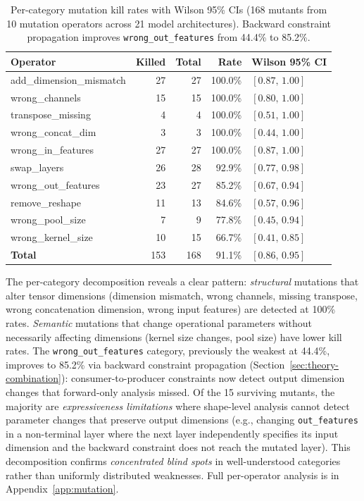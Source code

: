 \documentclass[11pt]{article}
\begin{document}
\begin{table}[h]
\centering
\caption{Per-category mutation kill rates with Wilson 95\% CIs
  (168 mutants from 10 mutation operators across 21 model architectures).
  Backward constraint propagation improves \texttt{wrong\_out\_features}
  from 44.4\% to 85.2\%.}
\label{tab:mutation-category}
\small
\begin{tabular}{@{}lrrrl@{}}
\toprule
\textbf{Operator} & \textbf{Killed} & \textbf{Total} & \textbf{Rate} &
  \textbf{Wilson 95\% CI} \\
\midrule
add\_dimension\_mismatch   & 27 & 27 & 100.0\% & $[0.87,\, 1.00]$ \\
wrong\_channels            & 15 & 15 & 100.0\% & $[0.80,\, 1.00]$ \\
transpose\_missing         &  4 &  4 & 100.0\% & $[0.51,\, 1.00]$ \\
wrong\_concat\_dim         &  3 &  3 & 100.0\% & $[0.44,\, 1.00]$ \\
wrong\_in\_features        & 27 & 27 & 100.0\% & $[0.87,\, 1.00]$ \\
swap\_layers               & 26 & 28 &  92.9\% & $[0.77,\, 0.98]$ \\
wrong\_out\_features       & 23 & 27 &  85.2\% & $[0.67,\, 0.94]$ \\
remove\_reshape            & 11 & 13 &  84.6\% & $[0.57,\, 0.96]$ \\
wrong\_pool\_size          &  7 &  9 &  77.8\% & $[0.45,\, 0.94]$ \\
wrong\_kernel\_size        & 10 & 15 &  66.7\% & $[0.41,\, 0.85]$ \\
\midrule
\textbf{Total}             & 153 & 168 & 91.1\% & $[0.86,\, 0.95]$ \\
\bottomrule
\end{tabular}
\end{table}

The per-category decomposition reveals a clear pattern:
\emph{structural} mutations that alter tensor dimensions
(dimension mismatch, wrong channels, missing transpose, wrong concatenation
dimension, wrong input features)
are detected at 100\% rates.  \emph{Semantic} mutations
that change operational parameters without necessarily affecting
dimensions (kernel size changes, pool size) have lower kill rates.
The \texttt{wrong\_out\_features} category, previously the weakest
at 44.4\%, improves to 85.2\% via backward constraint propagation
(Section~\ref{sec:theory-combination}): consumer-to-producer constraints
now detect output dimension changes that forward-only analysis missed.
Of the 15 surviving mutants, the majority are
\emph{expressiveness limitations} where shape-level analysis cannot detect
parameter changes that preserve output dimensions (e.g., changing
\texttt{out\_features} in a non-terminal layer where the next layer
independently specifies its input dimension and the backward constraint
does not reach the mutated layer).
This decomposition
confirms \emph{concentrated blind spots} in well-understood categories
rather than uniformly distributed weaknesses.
Full per-operator analysis is in Appendix~\ref{app:mutation}.
\end{document}
